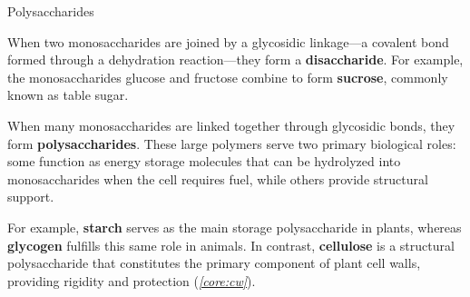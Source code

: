 \documentclass[10pt]{article}
\begin{document}
    \begin{core}{Polysaccharides}

      When two monosaccharides are joined by a glycosidic linkage---a covalent bond formed through a dehydration reaction---they form a \textbf{disaccharide}. For example, the monosaccharides glucose and fructose combine to form \textbf{sucrose}, commonly known as table sugar.


      When many monosaccharides are linked together through glycosidic bonds, they form \textbf{polysaccharides}. These large polymers serve two primary biological roles: some function as energy storage molecules that can be hydrolyzed into monosaccharides when the cell requires fuel, while others provide structural support.

      For example, \textbf{starch} serves as the main storage polysaccharide in plants, whereas \textbf{glycogen} fulfills this same role in animals. In contrast, \textbf{cellulose} is a structural polysaccharide that constitutes the primary component of plant cell walls, providing rigidity and protection (\textit{\autoref{core:cw}}).


    \end{core}
\end{document}
